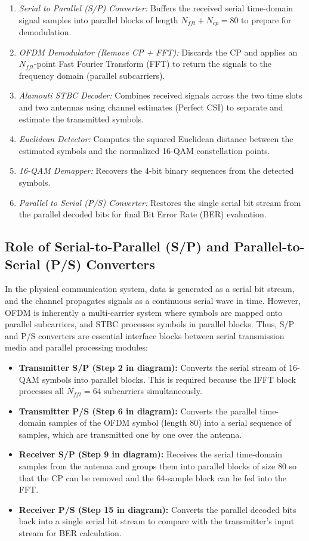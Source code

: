 \documentclass[a4paper]{article}
\begin{document}
\begin{itemize}
    \begin{enumerate}
        \item \textit{Serial to Parallel (S/P) Converter:} Buffers the received serial time-domain signal samples into parallel blocks of length $N_{fft} + N_{cp} = 80$ to prepare for demodulation.
        \item \textit{OFDM Demodulator (Remove CP + FFT):} Discards the CP and applies an $N_{fft}$-point Fast Fourier Transform (FFT) to return the signals to the frequency domain (parallel subcarriers).
        \item \textit{Alamouti STBC Decoder:} Combines received signals across the two time slots and two antennas using channel estimates (Perfect CSI) to separate and estimate the transmitted symbols.
        \item \textit{Euclidean Detector:} Computes the squared Euclidean distance between the estimated symbols and the normalized 16-QAM constellation points.
        \item \textit{16-QAM Demapper:} Recovers the 4-bit binary sequences from the detected symbols.
        \item \textit{Parallel to Serial (P/S) Converter:} Restores the single serial bit stream from the parallel decoded bits for final Bit Error Rate (BER) evaluation.
    \end{enumerate}
\end{itemize}

\subsection{Role of Serial-to-Parallel (S/P) and Parallel-to-Serial (P/S) Converters}
In the physical communication system, data is generated as a serial bit stream, and the channel propagates signals as a continuous serial wave in time. However, OFDM is inherently a multi-carrier system where symbols are mapped onto parallel subcarriers, and STBC processes symbols in parallel blocks. Thus, S/P and P/S converters are essential interface blocks between serial transmission media and parallel processing modules:
\begin{itemize}
    \item \textbf{Transmitter S/P (Step 2 in diagram):} Converts the serial stream of 16-QAM symbols into parallel blocks. This is required because the IFFT block processes all $N_{fft} = 64$ subcarriers simultaneously.
    \item \textbf{Transmitter P/S (Step 6 in diagram):} Converts the parallel time-domain samples of the OFDM symbol (length 80) into a serial sequence of samples, which are transmitted one by one over the antenna.
    \item \textbf{Receiver S/P (Step 9 in diagram):} Receives the serial time-domain samples from the antenna and groups them into parallel blocks of size 80 so that the CP can be removed and the 64-sample block can be fed into the FFT.
    \item \textbf{Receiver P/S (Step 15 in diagram):} Converts the parallel decoded bits back into a single serial bit stream to compare with the transmitter's input stream for BER calculation.
\end{itemize}
\end{document}
